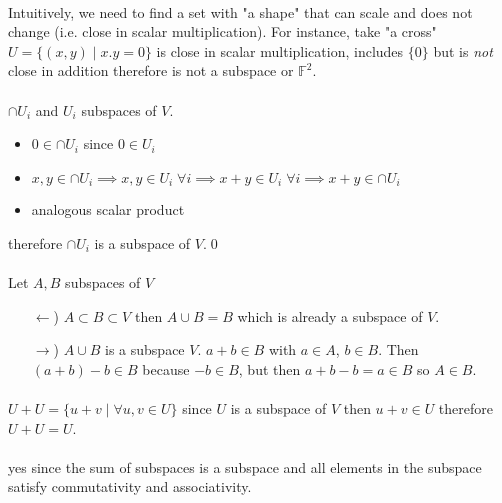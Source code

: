 \documentclass[11pt,notitlepage,oneside]{article}
\newcommand{\exo}[1]{%
\addtocontents{toc}{\protect\setcounter{tocdepth}{2}}%
\paragraph{#1}}
\begin{document}
\exo{} Intuitively, we need to find a set with "a shape" that can scale and does not change (i.e. close in scalar multiplication). 
For instance, take "a cross" $ U = \{ (x,y) \mid x.y = 0 \}$ is close in scalar multiplication, includes $\{0\}$ but is \emph{not} close in addition
therefore is not a subspace or $\mathbb{F}^2$.


\exo{}$\cap U_i$ and $U_i$ subspaces of $V$. 
\begin{itemize}
\item $0 \in \cap U_i$ since $0\in U_i$
\item $x,y \in \cap U_i \implies x,y \in U_i\; \forall i \implies x+y \in U_i\; \forall i \implies x+y\in \cap U_i$
\item analogous scalar product
\end{itemize}
therefore $\cap U_i$ is a subspace of $V$.\qed

\exo{} Let $A,B$ subspaces of $V$
\begin{itemize}
\item[$\leftarrow$)]$A\subset B \subset V$ then $A\cup B = B$ which is already a subspace of $V$.
\item[$\rightarrow$)] $A\cup B$ is a subspace $V$.  $a+b \in B$ with $a\in A$, $b\in B$. Then $ (a + b) - b \in B$ because $-b\in B$, but then $a + b - b = a \in B$ so $A\in B$.
\end{itemize}

\exo{}$U+U =\{ u+v \mid \forall u,v \in U\}$ since $U$ is a subspace of $V$ then $u+v\in U$ therefore $U+U=U$.

\exo{} yes since the sum of subspaces is a subspace and all elements in the subspace satisfy commutativity and associativity. 
\end{document}
